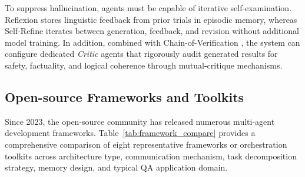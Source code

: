 To suppress hallucination, agents must be capable of iterative
self-examination.
Reflexion \citep{shinn2023reflexion} stores linguistic feedback from prior
trials in episodic memory, whereas Self-Refine
\citep{madaan2023self_refine} iterates between generation, feedback, and
revision without additional model training.
In addition, combined with Chain-of-Verification
\citep{dhuliawala2023chain_of_verification}, the system can configure
dedicated \emph{Critic} agents that rigorously audit generated results for
safety, factuality, and logical coherence through mutual-critique mechanisms.

\subsection{Open-source Frameworks and Toolkits}
\label{sec:framework_compare}

Since 2023, the open-source community has released numerous multi-agent
development frameworks.
Table~\ref{tab:framework_compare} provides a comprehensive comparison of
eight representative frameworks or orchestration toolkits across architecture type, communication
mechanism, task decomposition strategy, memory design, and typical QA
application domain.

